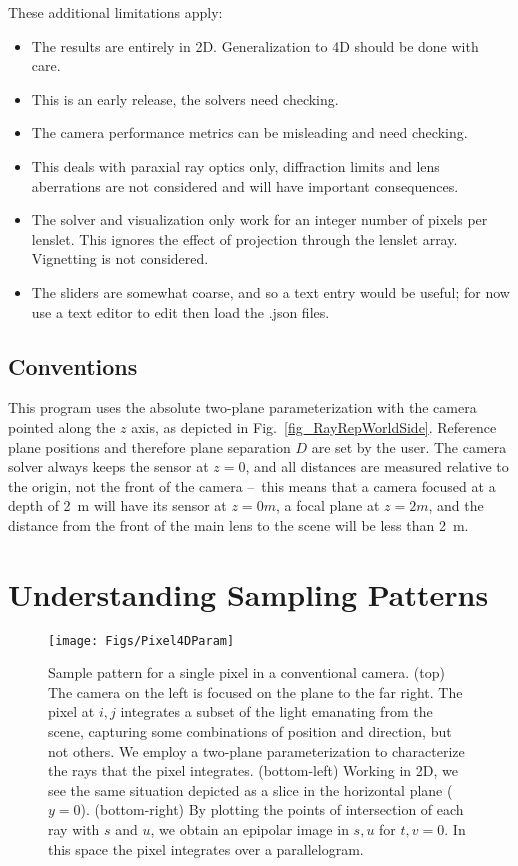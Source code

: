 \documentclass[onecolumn]{article}
\begin{document}
These additional limitations apply:
\begin{itemize}
\item The results are entirely in 2D.  Generalization to 4D should be done with care.
\item This is an early release, the solvers need checking.
\item The camera performance metrics can be misleading and need checking.
\item This deals with paraxial ray optics only, diffraction limits and lens aberrations are not considered and will have important consequences.
\item The solver and visualization only work for an integer number of pixels per lenslet.  This ignores the effect of projection through the lenslet array.  Vignetting is not considered.
\item The sliders are somewhat coarse, and so a text entry would be useful; for now use a text editor to edit then load the .json files.
\end{itemize}

\subsection{Conventions}

This program uses the absolute two-plane parameterization with the camera pointed along the $z$ axis, as depicted in Fig.~\ref{fig_RayRepWorldSide}.  Reference plane positions and therefore plane separation $D$ are set by the user.  The camera solver always keeps the sensor at $z=0$, and all distances are measured relative to the origin, not the front of the camera --~this means that a camera focused at a depth of 2~m will have its sensor at $z=0 m$, a focal plane at $z=2 m$, and the distance from the front of the main lens to the scene will be less than 2~m.


\section{Understanding Sampling Patterns}
\label{sect_FirstSomeBackground}

\begin{figure}
	\centering
	\texttt{[image: Figs/Pixel4DParam]}
	\caption{Sample pattern for a single pixel in a conventional camera. (top) The camera on the left is focused on the plane to the far right.  The pixel at $i,j$ integrates a subset of the light emanating from the scene, capturing some combinations of position and direction, but not others.  We employ a two-plane parameterization to characterize the rays that the pixel integrates.  (bottom-left) Working in 2D, we see the same situation depicted as a slice in the horizontal plane ($y=0$). (bottom-right) By plotting the points of intersection of each ray with $s$ and $u$, we obtain an epipolar image in $s,u$ for $t,v=0$.  In this space the pixel integrates over a parallelogram.}
	\label{fig_PixelParam2pp}
\end{figure}
\end{document}
